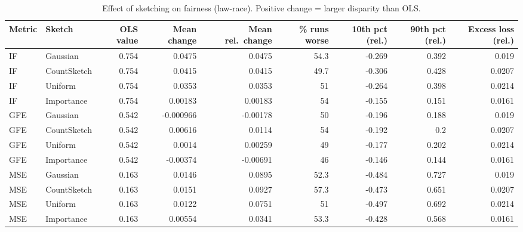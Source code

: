 \begin{table}[t]
\centering
\small
\begin{tabular}{llrrrrrrr}
\toprule
Metric & Sketch & OLS value & Mean change & Mean rel.\ change & \% runs worse & 10th pct (rel.) & 90th pct (rel.) & Excess loss (rel.) \\
\midrule
IF & Gaussian & 0.754 & 0.0475 & 0.0475 & 54.3 & -0.269 & 0.392 & 0.019 \\
IF & CountSketch & 0.754 & 0.0415 & 0.0415 & 49.7 & -0.306 & 0.428 & 0.0207 \\
IF & Uniform & 0.754 & 0.0353 & 0.0353 & 51 & -0.264 & 0.398 & 0.0214 \\
IF & Importance & 0.754 & 0.00183 & 0.00183 & 54 & -0.155 & 0.151 & 0.0161 \\
\midrule
GFE & Gaussian & 0.542 & -0.000966 & -0.00178 & 50 & -0.196 & 0.188 & 0.019 \\
GFE & CountSketch & 0.542 & 0.00616 & 0.0114 & 54 & -0.192 & 0.2 & 0.0207 \\
GFE & Uniform & 0.542 & 0.0014 & 0.00259 & 49 & -0.177 & 0.202 & 0.0214 \\
GFE & Importance & 0.542 & -0.00374 & -0.00691 & 46 & -0.146 & 0.144 & 0.0161 \\
\midrule
MSE & Gaussian & 0.163 & 0.0146 & 0.0895 & 52.3 & -0.484 & 0.727 & 0.019 \\
MSE & CountSketch & 0.163 & 0.0151 & 0.0927 & 57.3 & -0.473 & 0.651 & 0.0207 \\
MSE & Uniform & 0.163 & 0.0122 & 0.0751 & 51 & -0.497 & 0.692 & 0.0214 \\
MSE & Importance & 0.163 & 0.00554 & 0.0341 & 53.3 & -0.428 & 0.568 & 0.0161 \\
\bottomrule
\end{tabular}
\caption{Effect of sketching on fairness (law-race). Positive change = larger disparity than OLS.}
\label{tab:harm_law-race}
\end{table}